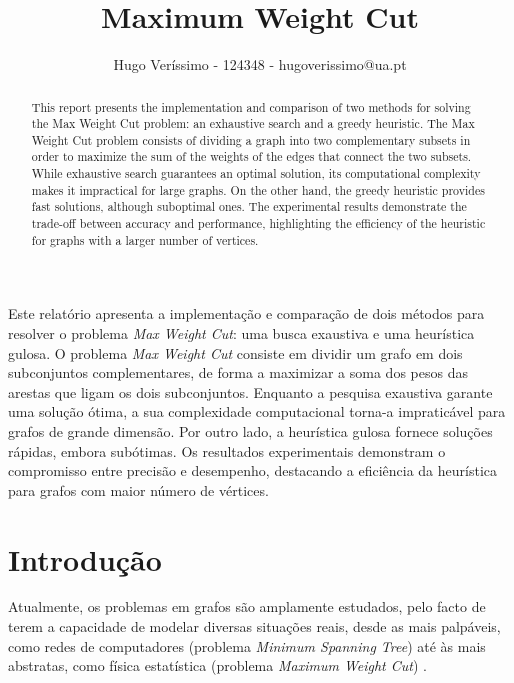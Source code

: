 \documentclass[mirror]{revdetua}
\begin{document}

\title{Maximum Weight Cut}
\author{Hugo Veríssimo - 124348 - hugoverissimo@ua.pt}
\maketitle

\begin{abstract}
This report presents the implementation and comparison of two methods for solving the Max Weight Cut problem: an exhaustive search and a greedy heuristic. The Max Weight Cut problem consists of dividing a graph into two complementary subsets in order to maximize the sum of the weights of the edges that connect the two subsets. While exhaustive search guarantees an optimal solution, its computational complexity makes it impractical for large graphs. On the other hand, the greedy heuristic provides fast solutions, although suboptimal ones. The experimental results demonstrate the trade-off between accuracy and performance, highlighting the efficiency of the heuristic for graphs with a larger number of vertices.
\end{abstract}

\begin{resumo}
Este relatório apresenta a implementação e comparação de dois métodos para resolver o problema \textit{Max Weight Cut}: uma busca exaustiva e uma heurística gulosa. O problema \textit{Max Weight Cut} consiste em dividir um grafo em dois subconjuntos complementares, de forma a maximizar a soma dos pesos das arestas que ligam os dois subconjuntos. Enquanto a pesquisa exaustiva garante uma solução ótima, a sua complexidade computacional torna-a impraticável para grafos de grande dimensão. Por outro lado, a heurística gulosa fornece soluções rápidas, embora subótimas. Os resultados experimentais demonstram o compromisso entre precisão e desempenho, destacando a eficiência da heurística para grafos com maior número de vértices.
\end{resumo}

\section{Introdução}

Atualmente, os problemas em grafos são amplamente estudados, pelo facto de terem a capacidade de modelar diversas situações reais, desde as mais palpáveis, como redes de computadores (problema \textit{Minimum Spanning Tree}) até às mais abstratas, como física estatística (problema \textit{Maximum Weight Cut}) \cite{WANG10}.
\end{document}
